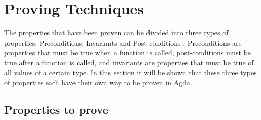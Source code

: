 \section{Proving Techniques}

The properties that have been proven can be divided into three types of properties: Preconditions, Invariants and Post-conditions \cite{meyer_1992}. Preconditions are properties that must be true when a function is called, post-conditions must be true after a function is called, and invariants are properties that must be true of all values of a certain type. In this section it will be shown that these three types of properties each have their own way to be proven in Agda.
\subsection{Properties to prove}\label{props_to_prove}

